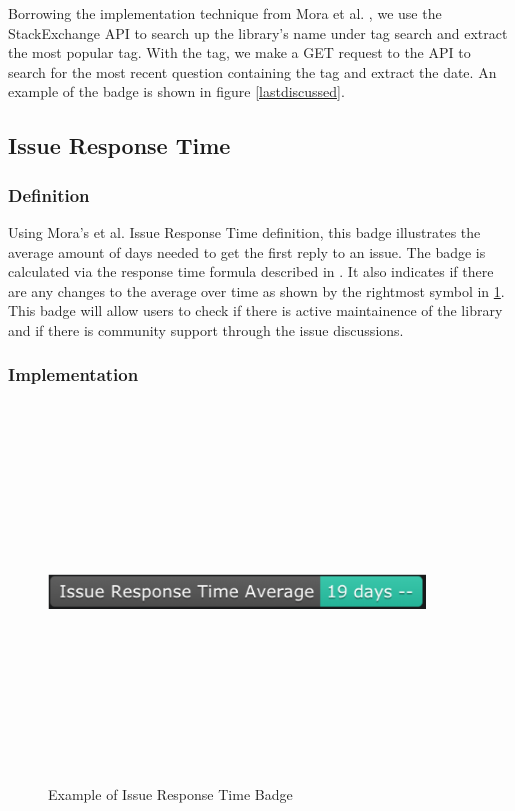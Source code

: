 \documentclass[12pt, letterpaper]{article}
\begin{document}
Borrowing the implementation technique from Mora et al. \cite{metrics}, we use the StackExchange API \cite{stackexchangeapi}
to search up the library's name under tag search and extract the most popular tag.
With the tag, we make a GET request to the API to search for the most recent question containing the tag
and extract the date. An example of the badge is shown in figure \ref{lastdiscussed}.

\subsection{Issue Response Time}
\subsubsection{Definition}
Using Mora's et al. \cite{metrics} Issue Response Time definition, this badge illustrates the average
amount of days needed to get the first reply to an issue. The badge is calculated via the response time
formula described in \cite{metrics}. It also indicates if there are any changes to the average over time 
as shown by the rightmost symbol in \ref{issueresponse}. 
This badge will allow users to check if there is active maintainence of the library and if there is community support
through the issue discussions. 

\subsubsection{Implementation}

\begin{figure}[!htb]
    \centerline{
        \includegraphics[width=10cm,height=10cm,keepaspectratio=true]{issueresponsebadge}
    }
    \caption{
        Example of Issue Response Time Badge
    }
    \label{issueresponse}
\end{figure}
\end{document}
